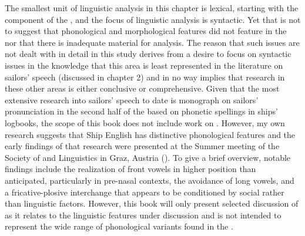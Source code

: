 The smallest unit of linguistic analysis in this chapter is lexical, starting with the  component of the , and the focus of linguistic analysis is syntactic. Yet that is not to suggest that phonological and morphological features did not feature in the  nor that there is inadequate material for analysis. The reason that such issues are not dealt with in detail in this study derives from a desire to focus on syntactic issues in the knowledge that this area is least represented in the literature on sailors’ speech (discussed in chapter 2) and in no way implies that research in these other areas is either conclusive or comprehensive. Given that the most extensive research into sailors’ speech to date is  monograph on sailors’ pronunciation in the second half of the  based on phonetic spellings in ships’ logbooks, the scope of this book does not include work on . However, my own research suggests that Ship English has distinctive phonological features and the early findings of that research were presented at the Summer meeting of the Society of  and  Linguistics in Graz, Austria (\citealt{Delgado2015}). To give a brief overview, notable findings include the realization of front vowels in higher position than anticipated, particularly in pre-nasal contexts, the avoidance of long vowels, and a fricative-plosive interchange that appears to be conditioned by social rather than linguistic factors. However, this book will only present selected discussion of  as it relates to the linguistic features under discussion and is not intended to represent the wide range of phonological variants found in the . 

